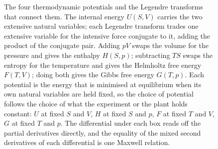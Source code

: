 \begin{figure}[htbp]
\centering
{}
\caption[The four thermodynamic potentials and the Legendre transforms linking
them]{The four thermodynamic potentials and the Legendre transforms that connect
them. The internal energy $U(S,V)$ carries the two extensive natural variables;
each Legendre transform trades one extensive variable for the intensive force
conjugate to it, adding the product of the conjugate pair. Adding $pV$ swaps the
volume for the pressure and gives the enthalpy $H(S,p)$; subtracting $TS$ swaps
the entropy for the temperature and gives the Helmholtz free energy $F(T,V)$;
doing both gives the Gibbs free energy $G(T,p)$. Each potential is the energy
that is minimised at equilibrium when its own natural variables are held fixed, so
the choice of potential follows the choice of what the experiment or the plant
holds constant: $U$ at fixed $S$ and $V$, $H$ at fixed $S$ and $p$, $F$ at fixed
$T$ and $V$, $G$ at fixed $T$ and $p$. The differential under each box reads off
the partial derivatives directly, and the equality of the mixed second
derivatives of each differential is one Maxwell relation.}
\label{fig:vol04ch04:thermodynamic-potentials}
\end{figure}
